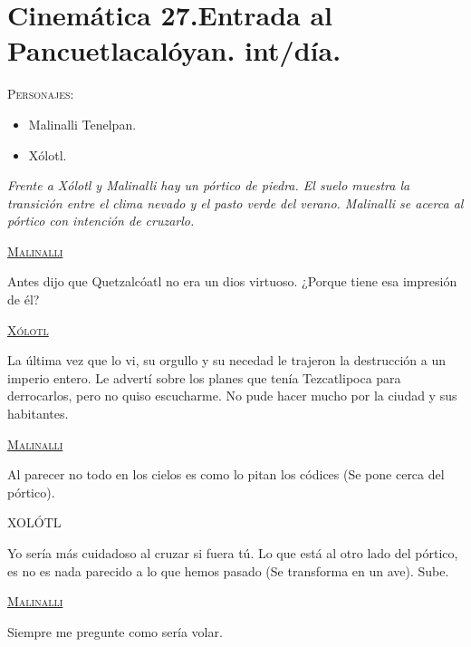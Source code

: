 \section{Cinemática 27.Entrada al Pancuetlacalóyan. int/día.}  \label{Cin:Cinematica27}
 \textsc{Personajes}:
 \begin{itemize}
 \item Malinalli Tenelpan.
\item Xólotl.
 \end{itemize}
\textit{Frente a Xólotl y Malinalli hay un pórtico de piedra. El suelo muestra la transición entre el clima nevado y el pasto verde del verano. Malinalli se acerca al pórtico con intención de cruzarlo.}
\begin{center}
\textsc{\underline{Malinalli}}
\\
\par
Antes dijo que Quetzalcóatl no era un dios virtuoso. ¿Porque tiene esa impresión de él?
\\
\par
\textsc{\underline{Xólotl}}
\\
\par
La última vez que lo vi, su orgullo y su necedad le trajeron la destrucción a un imperio entero. Le advertí sobre los planes que tenía Tezcatlipoca para derrocarlos, pero no quiso escucharme. No pude hacer mucho por la ciudad y sus habitantes.
\\
\par
\textsc{\underline{Malinalli}}
\\
\par
Al parecer no todo en los cielos es como lo pitan los códices (Se pone cerca del pórtico).
\\
\par
XOLÓTL
\\
\par
Yo sería más cuidadoso al cruzar si fuera tú. Lo que está al otro lado del pórtico, es no es nada parecido a lo que hemos pasado (Se transforma en un ave). Sube.
\\
\par
\textsc{\underline{Malinalli}}
\\
\par
Siempre me pregunte como sería volar.
\end{center}